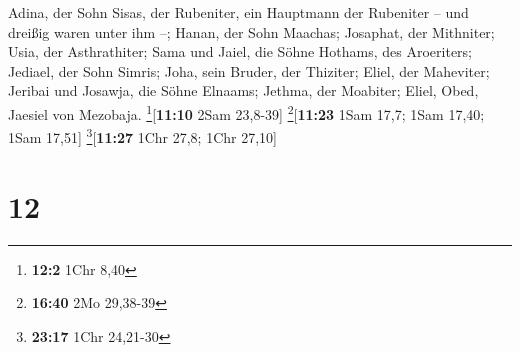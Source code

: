  Adina, der Sohn Sisas, der Rubeniter, ein Hauptmann der
Rubeniter -- und dreißig waren unter ihm --;  Hanan, der
Sohn Maachas; Josaphat, der Mithniter;  Usia, der
Asthrathiter; Sama und Jaiel, die Söhne Hothams, des Aroeriters;
 Jediael, der Sohn Simris; Joha, sein Bruder, der
Thiziter;  Eliel, der Maheviter; Jeribai und Josawja, die
Söhne Elnaams; Jethma, der Moabiter;  Eliel, Obed,
Jaesiel von Mezobaja. \footnote{\textbf{12:2} 1Chr 8,40}{[}\textbf{11:10}
2Sam 23,8-39{]} \footnote{\textbf{16:40} 2Mo 29,38-39}{[}\textbf{11:23}
1Sam 17,7; 1Sam 17,40; 1Sam 17,51{]} \footnote{\textbf{23:17} 1Chr
  24,21-30}{[}\textbf{11:27} 1Chr 27,8; 1Chr 27,10{]}

\hypertarget{section-11}{%
\section{12}\label{section-11}}

